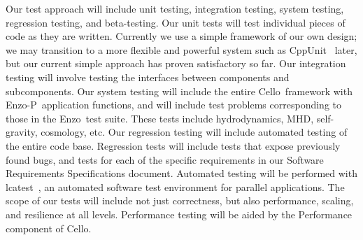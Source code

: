 \documentclass[11pt,letterpaper]{article}
\newcommand{\cello}{\textsf{Cello}}
\newcommand{\enzo}{\textsf{Enzo}}
\newcommand{\enzoii}{\textsf{Enzo-P}}
\newcommand{\lcatest}{\textsf{lcatest}}
\newcommand{\code}[1]{\textsf{#1}}
\begin{document}
Our test approach will include unit testing, integration testing,
system testing, regression testing, and beta-testing.  Our unit tests
will test individual pieces of code as they are written.  Currently we
use a simple framework of our own design; we may transition to a more
flexible and powerful system such as CppUnit~\cite{wwwcppunit} later,
but our current simple approach has proven satisfactory so far.  Our
integration testing will involve testing the interfaces between
components and subcomponents.  Our system testing will include the
entire \cello\ framework with \enzoii\ application functions, and will
include test problems corresponding to those in the \enzo\ test suite.
These tests include hydrodynamics, MHD, self-gravity, cosmology, etc.
Our regression testing will include automated testing of the entire
code base.  Regression tests will include tests that expose previously
found bugs, and tests for each of the specific requirements in our
Software Requirements Specifications document.  Automated testing will
be performed with \lcatest~\cite{wwwlcatest}, an automated software
test environment for parallel applications.
The scope of our tests will include not just correctness, but also
performance, scaling, and resilience at all levels.  Performance
testing will be aided by the \code{Performance} component of \cello.

\end{document}
